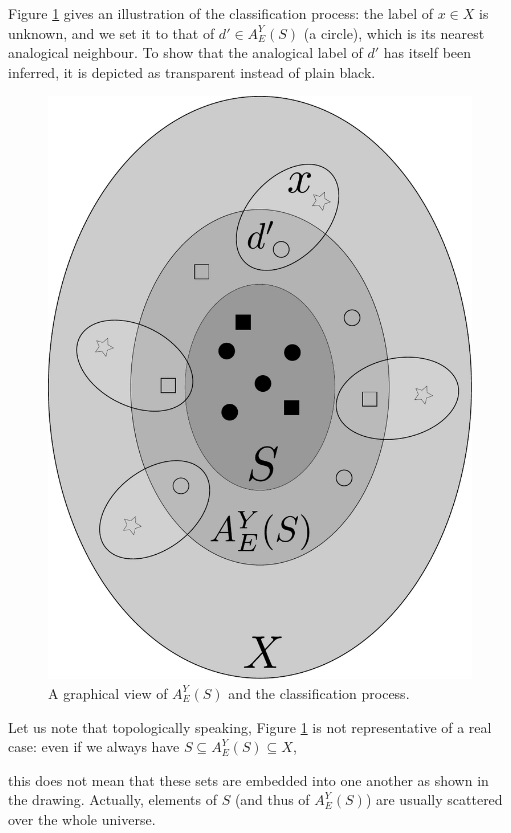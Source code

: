 Figure \ref{extension} gives an illustration of the classification process: the
label of $x \in X$ is unknown, and we set it to that of $d' \in A_E^Y(S)$ (a
circle), which is its nearest analogical neighbour. To show that the analogical
label of $d'$ has itself been inferred, it is depicted as transparent instead of
plain black.
\begin{figure}
\caption{A graphical view of $A_E^Y(S)$ and the classification process.}
\label{extension}
\begin{center}
\includegraphics[scale=0.20]{figures/analogical_extension.pdf}
\end{center}
\end{figure}
Let us note that topologically speaking, Figure \ref{extension} is not
representative of a real case: even if we always have $S \subseteq A_E^Y(S) \subseteq X$,

this does not mean that these sets are embedded into one another as shown in
the drawing. Actually, elements of $S$ (and thus of $A_E^Y(S)$) are usually
scattered over the whole universe.

